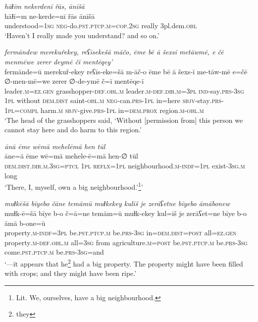 \ea \label{HB.93}
\textit{hāɫīm nekerdenī řās, ānīšā} \\ 
\gll hāɫī=m ne-kerde=nī řās ānīšā \\ 
 understood\textsc{=1sg} \textsc{neg-}do\textsc{.pst}\textsc{.ptcp}\textsc{.m}\textsc{=cop}\textsc{.\textsc{2sg}} really 3pl.dem\textsc{.obl} \\ 
\glt `Haven’t I really made you understand? and so on.'
\z 


\ea \label{PM.5}
\textit{fermāndew merekuřekey, reʕīsekešā māčo, ēme bē ā šexsī metāwmē, e čē menmēwe zerer deymē čī mentēqey’} \\ 
\gll fermānde=ū merekuř-ekey reʕīs-eke=šā m-āč-o ēme bē ā šexs-ī me-tāw-mē e=čē ∅-men-mē=we zerer ∅-de-ymē č=ī mentēqe-ī \\ 
 leader\textsc{.m}\textsc{\textsc{=ez.gen}} grasshopper\textsc{-def}\textsc{.obl}\textsc{.m} leader\textsc{.m}\textsc{-def}\textsc{.dir}\textsc{.m}\textsc{=3pl} \textsc{ind-}say\textsc{.prs}\textsc{-3sg} \textsc{1pl} without \textsc{dem.dist} saint\textsc{-obl}\textsc{.m} \textsc{neg-}can\textsc{.prs}\textsc{-1pl} in=here \textsc{sbjv-}stay\textsc{.prs}\textsc{-1pl}\textsc{=compl} harm\textsc{.m} \textsc{sbjv-}give\textsc{.prs}-\textsc{1pl} in=\textsc{dem.prox} region\textsc{.m}\textsc{-obl}\textsc{.m} \\ 
\glt `The head of the grasshoppers said, ‘Without [permission from] this person we cannot stay here and do harm to this region.'
\z 
 
\ea \label{PM.17}
\textit{ānā ēme wēmā mehelēmā hen tūl} \\ 
\gll āne=ā ēme wē=mā mehele-ē=mā hen-∅ tūl \\ 
 \textsc{dem.dist}\textsc{.dir}\textsc{.m}\textsc{.3sg}=\textsc{ptcl} \textsc{1pl} \textsc{reflx}\textsc{=1pl} neighbourhood\textsc{.m}\textsc{-indf}\textsc{=1pl} exist\textsc{-3sg}\textsc{.m} long \\ 
\glt `There, I, myself, own a big neighbourhood.’\footnote{Lit. We, ourselves, have a big neighbourhood.}'
\z 
 
\ea \label{PM.18}
\textit{muɫkēšā bīyebo čāne temāmū muɫkekey kuliš je zerāʕetne bīyebo āmābonew} \\ 
\gll muɫk-ē=šā bīye b-o č=ā=ne temām=ū muɫk-ekey kul=iš je zerāʕet=ne bīye b-o āmā b-one=ū \\ 
 property\textsc{.m}\textsc{-indf}\textsc{=3pl} be\textsc{.pst}\textsc{.ptcp}\textsc{.m} be\textsc{.prs}\textsc{-3sg} in=\textsc{dem.dist}\textsc{=\textsc{post}} all\textsc{\textsc{=ez.gen}} property\textsc{.m}\textsc{-def}\textsc{.obl}\textsc{.m} all\textsc{=3sg} from agriculture\textsc{.m}\textsc{=\textsc{post}} be\textsc{.pst}\textsc{.ptcp}\textsc{.m} be\textsc{.prs}\textsc{-3sg} come\textsc{.pst}\textsc{.ptcp}\textsc{.m} be\textsc{.prs}\textsc{-3sg}=and \\ 
\glt `—īt appears that he\footnote{they} had a big property. The property might have been filled with crops; and they might have been ripe.'
\z 
 
